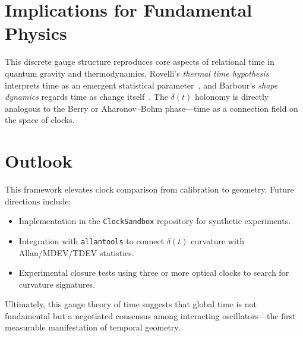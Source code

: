 \documentclass[11pt,a4paper]{article}
\begin{document}
\section{Implications for Fundamental Physics}
This discrete gauge structure reproduces core aspects of relational time in quantum gravity and thermodynamics. 
Rovelli's \emph{thermal time hypothesis} interprets time as an emergent statistical parameter~\citep{Rovelli1993}, and Barbour's \emph{shape dynamics} regards time as change itself~\citep{Barbour1999}. 
The $\delta(t)$ holonomy is directly analogous to the Berry or Aharonov–Bohm phase—time as a connection field on the space of clocks.

\section{Outlook}
This framework elevates clock comparison from calibration to geometry. 
Future directions include:
\begin{itemize}
\item Implementation in the \texttt{ClockSandbox} repository for synthetic experiments.
\item Integration with \texttt{allantools} to connect $\delta(t)$ curvature with Allan/MDEV/TDEV statistics.
\item Experimental closure tests using three or more optical clocks to search for curvature signatures.
\end{itemize}
Ultimately, this gauge theory of time suggests that global time is not fundamental but a negotiated consensus among interacting oscillators—the first measurable manifestation of temporal geometry.
\end{document}
